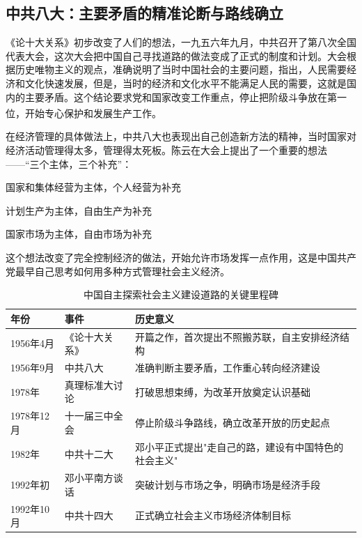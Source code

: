 \documentclass[12pt, a4paper]{ctexart}
\newcommand{\upcite}[1]{\textsuperscript{\cite{#1}}}
\numberwithin{table}{section}
\numberwithin{figure}{section}
\begin{document}
\subsection{中共八大：主要矛盾的精准论断与路线确立}
《论十大关系》初步改变了人们的想法，一九五六年九月，中共召开了第八次全国代表大会，这次大会把中国自己寻找道路的做法变成了正式的制度和计划。大会根据历史唯物主义的观点，准确说明了当时中国社会的主要问题，指出，人民需要经济和文化快速发展，但是，当时的经济和文化水平不能满足人民的需要，这就是国内的主要矛盾。这个结论要求党和国家改变工作重点，停止把阶级斗争放在第一位，开始专心保护和发展生产工作\upcite{ref8}。

在经济管理的具体做法上，中共八大也表现出自己创造新方法的精神，当时国家对经济活动管理得太多，管理得太死板。陈云在大会上提出了一个重要的想法——“三个主体，三个补充”：

\begin{bluequotebox}
\begin{description}[style=nextline, leftmargin=1.5em, font=\bfseries]
  \item[经营形式] 国家和集体经营为主体，个人经营为补充
  \item[生产计划] 计划生产为主体，自由生产为补充
  \item[市场形式] 国家市场为主体，自由市场为补充
\end{description}
\end{bluequotebox}

\noindent 这个想法改变了完全控制经济的做法，开始允许市场发挥一点作用，这是中国共产党最早自己思考如何用多种方式管理社会主义经济。

\vspace{0.5em}
\begin{table}[htbp]
\centering
\caption{中国自主探索社会主义建设道路的关键里程碑}
\begin{tabularx}{0.92\textwidth}{>{\centering\arraybackslash}p{2cm} >{\centering\arraybackslash}p{3cm} X}
\toprule
\textbf{年份} & \textbf{事件} & \textbf{历史意义} \\
\midrule
1956年4月 & 《论十大关系》 & 开篇之作，首次提出不照搬苏联，自主安排经济结构 \\
\addlinespace
1956年9月 & 中共八大 & 准确判断主要矛盾，工作重心转向经济建设 \\
\addlinespace
1978年 & 真理标准大讨论 & 打破思想束缚，为改革开放奠定认识基础 \\
\addlinespace
1978年12月 & 十一届三中全会 & 停止阶级斗争路线，确立改革开放的历史起点 \\
\addlinespace
1982年 & 中共十二大 & 邓小平正式提出"走自己的路，建设有中国特色的社会主义" \\
\addlinespace
1992年初 & 邓小平南方谈话 & 突破计划与市场之争，明确市场是经济手段 \\
\addlinespace
1992年10月 & 中共十四大 & 正式确立社会主义市场经济体制目标 \\
\bottomrule
\end{tabularx}
\end{table}
\end{document}
